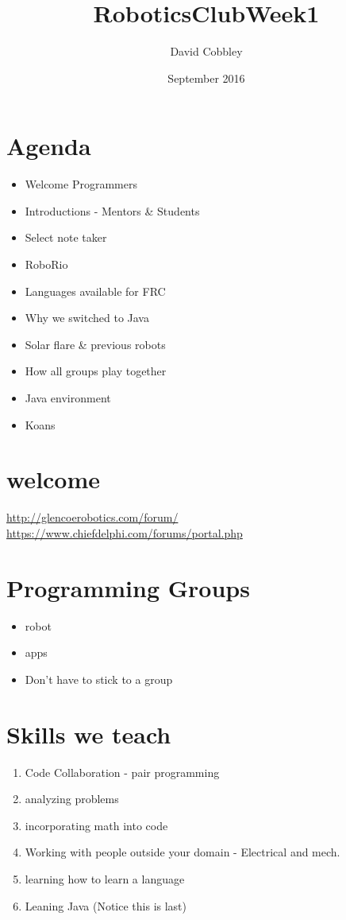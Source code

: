 \documentclass[12pt]{article}
\title{RoboticsClubWeek1}
\author{David Cobbley }
\date{September 2016}
\begin{document}
\maketitle

\section{Agenda}
\begin{itemize}
    \item Welcome Programmers
    \item Introductions - Mentors \& Students
    \item Select note taker
    \item RoboRio
    \item Languages available for FRC
    \item Why we switched to Java
    \item Solar flare \& previous robots
    \item How all groups play together
    \item Java environment
    \item Koans
\end{itemize}

\section{welcome}
\url{http://glencoerobotics.com/forum/}
\url{https://www.chiefdelphi.com/forums/portal.php}

\section{Programming Groups}
\begin{itemize}
    \item robot
    \item apps
    \item Don't have to stick to a group
\end{itemize}

\section{Skills we teach}
\begin{enumerate}
    \item Code Collaboration - pair programming
    \item analyzing problems
    \item incorporating math into code
    \item Working with people outside your domain - Electrical and mech.
    \item learning how to learn a language
    \item Leaning Java (Notice this is last)
\end{enumerate}
\end{document}

